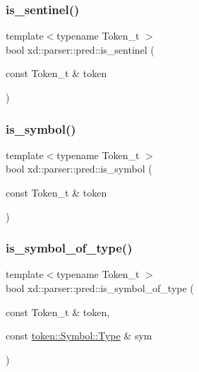 \mbox{\label{namespacexd_1_1parser_1_1pred_aa68f76bb0da46b5d4392a3acb5098c0e}} 
\subsubsection{\texorpdfstring{is\+\_\+sentinel()}{is\_sentinel()}}
{\footnotesize\ttfamily template$<$typename Token\+\_\+t $>$ \\
bool xd\+::parser\+::pred\+::is\+\_\+sentinel (\begin{DoxyParamCaption}\item[{const Token\+\_\+t \&}]{token }\end{DoxyParamCaption})}

\mbox{\label{namespacexd_1_1parser_1_1pred_a84b45d8cbaa3e33f7f8f9c7c9ba6164f}} 
\subsubsection{\texorpdfstring{is\+\_\+symbol()}{is\_symbol()}}
{\footnotesize\ttfamily template$<$typename Token\+\_\+t $>$ \\
bool xd\+::parser\+::pred\+::is\+\_\+symbol (\begin{DoxyParamCaption}\item[{const Token\+\_\+t \&}]{token }\end{DoxyParamCaption})}

\mbox{\label{namespacexd_1_1parser_1_1pred_ad3c7f43fc9d10192b7d46a76339e25d1}} 
\subsubsection{\texorpdfstring{is\+\_\+symbol\+\_\+of\+\_\+type()}{is\_symbol\_of\_type()}}
{\footnotesize\ttfamily template$<$typename Token\+\_\+t $>$ \\
bool xd\+::parser\+::pred\+::is\+\_\+symbol\+\_\+of\+\_\+type (\begin{DoxyParamCaption}\item[{const Token\+\_\+t \&}]{token,  }\item[{const \mbox{\hyperlink{classxd_1_1parser_1_1token_1_1_symbol_a1ccd1a684e22809f543b496a29564483}{token\+::\+Symbol\+::\+Type}} \&}]{sym }\end{DoxyParamCaption})}

